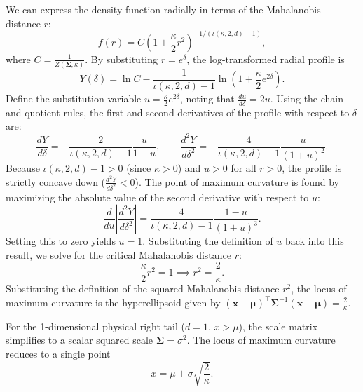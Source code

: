 \documentclass[twoside,11pt]{article}
\renewenvironment{proof}{\par\noindent{\bf Proof\ }}{\hfill\BlackBox\par\vspace{2mm}}
\begin{document}
\begin{proof}
We can express the density function radially in terms of the Mahalanobis distance $r$:
\begin{equation}
    f(r) = C \left( 1 + \frac{\kappa}{2} r^2 \right)^{-1/(\iota(\kappa,2,d)-1)},
\end{equation}
where $C = \frac{1}{Z(\boldsymbol{\Sigma}, \kappa)}$. By substituting $r = e^\delta$, the log-transformed radial profile is
\begin{equation}
    Y(\delta) = \ln C - \frac{1}{\iota(\kappa,2,d)-1} \ln\left(1 + \frac{\kappa}{2} e^{2\delta}\right).
\end{equation}
Define the substitution variable $u = \frac{\kappa}{2} e^{2\delta}$, noting that $\frac{du}{d\delta} = 2u$. Using the chain and quotient rules, the first and second derivatives of the profile with respect to $\delta$ are:
\begin{equation}
    \frac{dY}{d\delta} = -\frac{2}{\iota(\kappa,2,d)-1} \frac{u}{1+u}, \quad \quad \frac{d^2Y}{d\delta^2} = -\frac{4}{\iota(\kappa,2,d)-1} \frac{u}{(1+u)^2}.
\end{equation}
Because $\iota(\kappa,2,d)-1 > 0$ (since $\kappa > 0$) and $u > 0$ for all $r > 0$, the profile is strictly concave down ($\frac{d^2Y}{d\delta^2} < 0$). The point of maximum curvature is found by maximizing the absolute value of the second derivative with respect to $u$:
\begin{equation}
    \frac{d}{du} \left| \frac{d^2Y}{d\delta^2} \right| = \frac{4}{\iota(\kappa,2,d)-1} \frac{1 - u}{(1+u)^3}.
\end{equation}
Setting this to zero yields $u = 1$. Substituting the definition of $u$ back into this result, we solve for the critical Mahalanobis distance $r$:
\begin{equation}
    \frac{\kappa}{2} r^2 = 1 \implies r^2 = \frac{2}{\kappa}.
\end{equation}
Substituting the definition of the squared Mahalanobis distance $r^2$, the locus of maximum curvature is the hyperellipsoid given by $(\mathbf{x} - \boldsymbol{\mu})^\intercal \boldsymbol{\Sigma}^{-1} (\mathbf{x} - \boldsymbol{\mu}) = \frac{2}{\kappa}$.
\end{proof}

\begin{corollary}
\label{cor:bending_point_1d}
For the 1-dimensional physical right tail ($d=1$, $x > \mu$), the scale matrix simplifies to a scalar squared scale $\boldsymbol{\Sigma} = \sigma^2$. The locus of maximum curvature reduces to a single point
\begin{equation}
    x = \mu + \sigma \sqrt{\frac{2}{\kappa}}.
\end{equation}
\end{corollary}
\end{document}
